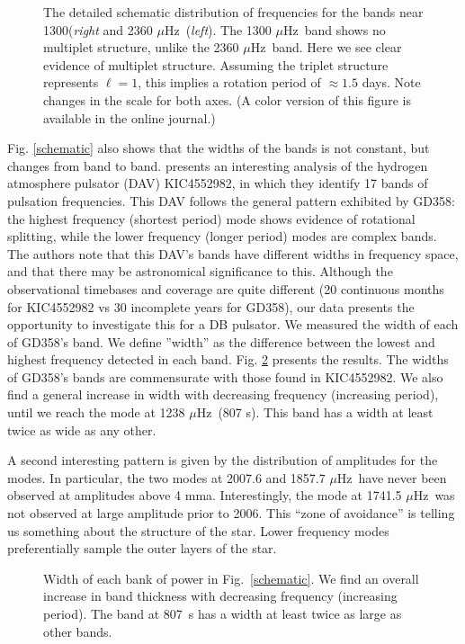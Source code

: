\documentclass[12pt,preprint]{aastex}
\newcommand{\muHz}{\mbox{$\mu$Hz}}
\begin{document}
\begin{figure}
 \caption{The detailed schematic distribution of frequencies for the bands near 1300({\em{right}}
 and 2360 \muHz\ ({\em{left}}). The 1300 \muHz\ band shows no multiplet structure, unlike the 2360 \muHz\
 band. Here we see clear evidence of multiplet structure. Assuming the triplet structure represents
 $\ell=1$, this implies a rotation period of $\approx 1.5$ days. Note changes in the scale for both axes.
 (A color version of this figure is available in the online journal.)
 \label{rot}}
\end{figure}

Fig. \ref{schematic} also shows that the widths of the bands is not constant, but changes from band to band.
\citet{Bell15} presents an interesting analysis of the hydrogen atmosphere pulsator (DAV) KIC4552982, 
in which they identify 17 bands of pulsation frequencies. This DAV follows the general pattern exhibited 
by GD358: the highest frequency (shortest period) mode shows evidence of rotational splitting, while the 
lower frequency (longer period) modes are complex bands. The authors note that this DAV's bands have 
different widths in frequency space, and that there may be astronomical significance to this. Although the 
observational timebases and coverage are quite different (20 continuous months for KIC4552982 vs 30 
incomplete years for GD358), our data presents the opportunity to investigate this for a DB pulsator.  
We measured the width of each of GD358's band. We define ''width'' as the difference between the 
lowest and highest frequency detected in each band. Fig. \ref{thick} presents the results. 
The widths of GD358's bands are commensurate with those found in KIC4552982.  We also find a general 
increase in width with decreasing frequency (increasing period), until we reach 
the mode at 1238 \muHz\ (807 s). This band has a width at least twice as wide as any other. 

A second interesting pattern is given by the distribution of amplitudes for the modes.  In particular, the 
two modes at 2007.6 and 1857.7 \muHz\ have never been observed at amplitudes above 4 mma.  Interestingly, the 
mode at 1741.5 \muHz\ was not observed at large amplitude prior to 2006.  This ``zone of avoidance'' is telling 
us something about the structure of the star. Lower frequency modes preferentially sample the outer layers of 
the star.  
\begin{figure}
 \caption{Width of each bank of power in Fig.~\ref{schematic}. We find an overall increase 
 in band thickness with decreasing frequency (increasing period).  The band at 807~s has a width
 at least twice as large as other bands.  
 \label{thick}}
\end{figure}
\end{document}
